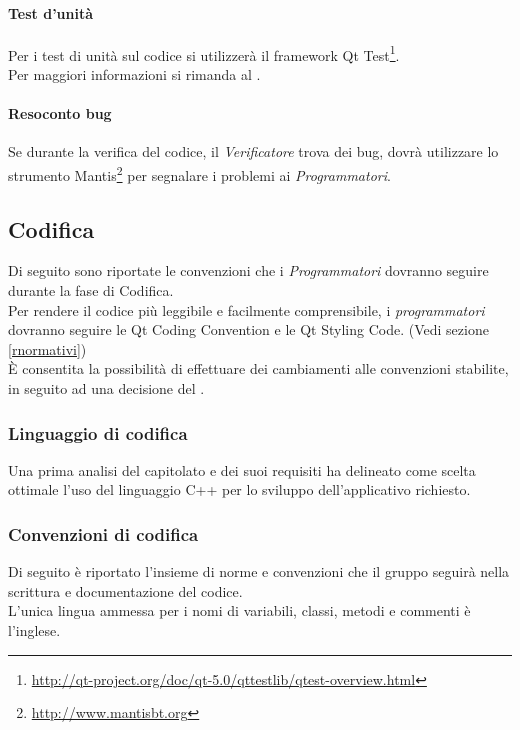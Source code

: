 \paragraph{Test d'unità\\}
\label{test_unità}
Per i test di unità sul codice si utilizzerà il framework\glossario{} Qt Test\footnote{\url{http://qt-project.org/doc/qt-5.0/qttestlib/qtest-overview.html}}.
\\Per maggiori informazioni si rimanda al \PdQ{}.

\paragraph{Resoconto bug\\}
\label{resoconto_bug}
Se durante la verifica del codice, il \emph{Verificatore} trova dei bug\glossario{}, dovrà utilizzare lo strumento Mantis\footnote{\url{http://www.mantisbt.org}} per segnalare i problemi ai \emph{Programmatori}.

\subsection{Codifica}
\label{codifica}
Di seguito sono riportate le convenzioni che i \emph{Programmatori} dovranno seguire durante la fase di Codifica.
\\Per rendere il codice più leggibile e facilmente comprensibile, i \emph{programmatori} dovranno seguire le Qt\glossario{} Coding Convention e le Qt\glossario{} Styling Code. (Vedi sezione \ref{rnormativi})
\\È consentita la possibilità di effettuare dei cambiamenti alle convenzioni stabilite, in seguito ad una decisione del \projectManager{}. 

\subsubsection{Linguaggio di codifica}
\label{linguaggio}
Una prima analisi del capitolato e dei suoi requisiti ha delineato come scelta ottimale l'uso del linguaggio C++\glossario{} per lo sviluppo dell'applicativo richiesto.

\subsubsection{Convenzioni di codifica}
\label{convenzioni}
Di seguito è riportato l'insieme di norme e convenzioni che il gruppo \authorName{} seguirà nella scrittura e documentazione del codice.
\\L'unica lingua ammessa per i nomi di variabili, classi, metodi e commenti è l'inglese.

